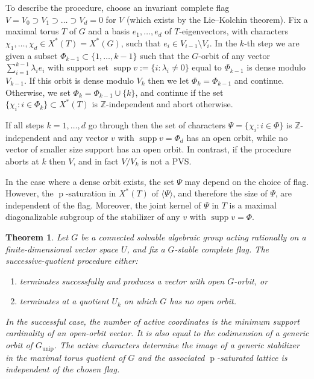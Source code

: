 \documentclass[12pt]{article}
\newtheorem{theorem}{Theorem}[section]
\newcommand{\Z}{\mathbb{Z}}
\newcommand{\supp}{\operatorname{supp}}
\newcommand{\rad}[1]{#1_{\operatorname{unip}}}
\newcommand{\charexp}{\operatorname{p}}
\newcommand{\PVS}{PVS}
\begin{document}
To describe the procedure, choose an invariant complete flag $V=V_0\supset V_1\supset\dots\supset V_d=0$ for $V$ (which exists by the Lie--Kolchin theorem).
Fix a maximal torus $T$ of $G$ and a basis $e_1,\dots,e_d$ of $T$-eigenvectors, with characters $\chi_1,\dots,\chi_d\in X^*(T)=X^*(G)$, such that $e_i\in V_{i-1}\setminus V_i$.
In the $k$-th step we are given a subset $\Phi_{k-1}\subset\{1,\dots,k-1\}$ such that the $G$-orbit of any vector $\sum_{i=1}^{k-1}\lambda_i e_i$
with support set $\supp v:=\{i:\lambda_i\ne0\}$ equal to $\Phi_{k-1}$ is dense modulo $V_{k-1}$.
If this orbit is dense modulo $V_k$ then we let $\Phi_k=\Phi_{k-1}$ and continue.
Otherwise, we set $\Phi_k=\Phi_{k-1}\cup\{k\}$, and continue if the set $\{\chi_i: i\in\Phi_k\}\subset X^*(T)$ is $\Z$-independent and abort otherwise.

If all steps $k=1,\dots,d$ go through then the set of characters $\Psi=\{\chi_i: i\in\Phi\}$ is $\Z$-independent and any vector $v$
with $\supp v=\Phi_d$ has an open orbit, while no vector of smaller size support has an open orbit.
In contrast, if the procedure aborts at $k$ then $V$, and in fact $V/V_k$ is not a \PVS.

In the case where a dense orbit exists, the set $\Psi$ may depend on the choice of flag.
However, the $\charexp$-saturation in $X^*(T)$ of $\langle\Psi\rangle$, and therefore the size of $\Psi$, are independent of the flag.
Moreover, the joint kernel of $\Psi$ in $T$ is a maximal diagonalizable subgroup of the stabilizer of any $v$ with $\supp v=\Phi$.


\begin{theorem}
Let $G$ be a connected solvable algebraic group acting rationally on a finite-dimensional vector space $U$, and fix a $G$-stable complete flag.
The successive-quotient procedure either:
\begin{enumerate}
\item terminates successfully and produces a vector with open $G$-orbit, or
\item terminates at a quotient $U_k$ on which $G$ has no open orbit.
\end{enumerate}
In the successful case, the number of active coordinates is the minimum support cardinality of an open-orbit vector.
It is also equal to the codimension of a generic orbit of $\rad{G}$.
The active characters determine the image of a generic stabilizer in the maximal torus quotient of $G$ and the associated
$\charexp$-saturated lattice is independent of the chosen flag.
\end{theorem}
\end{document}
